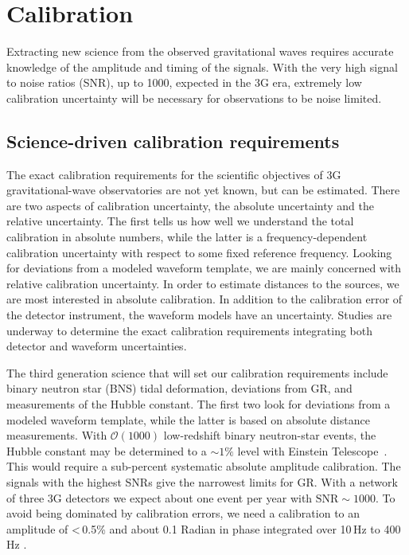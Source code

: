 \chapter{Calibration}
\label{sec:Calibration}
\vspace{-1.8cm}


Extracting new science from the observed gravitational waves requires accurate knowledge of the amplitude and timing of the signals. With the very high signal to noise ratios (SNR), up to 1000, expected in the 3G era, extremely low calibration uncertainty will be necessary for observations to be noise limited.

\section{Science-driven calibration requirements}
The exact calibration requirements for the scientific objectives of 3G gravitational-wave observatories are not yet known, but can be estimated. There are two aspects of calibration uncertainty, the absolute uncertainty and the relative uncertainty. The first tells us how well we understand the total calibration in absolute numbers, while the latter is a frequency-dependent calibration uncertainty with respect to some fixed reference frequency. 
Looking for deviations from a modeled waveform template, we are mainly concerned with relative calibration uncertainty. In order to estimate distances to the sources, we are most interested in absolute calibration.
In addition to the calibration error of the detector instrument, the waveform models have an uncertainty.
Studies are underway to determine the exact calibration requirements integrating both detector and waveform uncertainties.

The third generation science that will set our calibration requirements include binary neutron star (BNS) tidal deformation, deviations from GR, and measurements of the Hubble constant. The first two look for deviations from a modeled waveform template, while the latter is based on absolute distance measurements. With $\mathcal{O}(1000)$ low-redshift binary neutron-star events, the Hubble constant may be determined to a ${\sim}1\%$ level with Einstein Telescope~\cite{Cai:2016sby}.
This would require a sub-percent systematic absolute amplitude calibration.
The signals with the highest SNRs give the narrowest limits for GR. With a network of three 3G detectors we expect about one event per year with $\text{SNR} \sim 1000$. To avoid being dominated by calibration errors, we need a calibration to an amplitude of <\,0.5\% and
about 0.1 Radian in phase integrated over 10\,Hz to 400\,Hz \cite{SathyaPers2019}.

